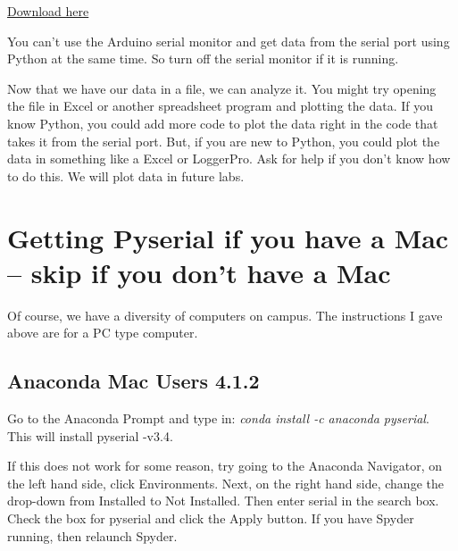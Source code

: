 \href{https://raw.githubusercontent.com/rtlines/IntermediateLabPH250/main/Code/Data2Computer_ArduinoSide_Win.ino}{Download here}



You can't use the Arduino serial monitor and get data from the serial port using Python at the same time. So turn off the serial monitor if it is running.

Now that we have our data in a file, we can analyze it. You might try opening the file in Excel or another spreadsheet program and plotting the data. If you know Python, you could add more code to plot the data right in the code that takes it from the serial port. But, if you are new to Python, you could plot the data in something like a Excel or LoggerPro. Ask for help if you don't know how to do this. We will plot data in future labs.

\section{Getting Pyserial if you have a Mac -- skip if you don't have a Mac}

Of course, we have a diversity of computers on campus. The instructions I gave above are for a PC type computer.

\subsection{Anaconda Mac Users 4.1.2}

Go to the Anaconda Prompt and type in: \textit{conda install -c anaconda pyserial}. This will install pyserial -v3.4.


If this does not work for some reason, try going to the Anaconda Navigator, on the left hand side, click Environments. Next, on the right hand side, change the drop-down from Installed to Not Installed. Then enter serial in the search box. Check the box for pyserial and click the Apply button. If you have Spyder running, then relaunch Spyder.


